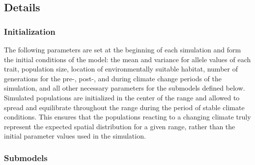 \documentclass[11pt, oneside]{article}
\begin{document}
\subsection{Details}
\subsubsection{Initialization}
The following parameters are set at the beginning of each simulation and form the initial conditions of the model: the mean and variance for allele values of each trait, population size, location of environmentally suitable habitat, number of generations for the pre-, post-, and during climate change periods of the simulation, and all other necessary parameters for the submodels defined below. Simulated populations are initialized in the center of the range and allowed to spread and equilibrate throughout the range during the period of stable climate conditions. This ensures that the populations reacting to a changing climate truly represent the expected spatial distribution for a given range, rather than the initial parameter values used in the simulation.

\subsubsection{Submodels}
\end{document}
